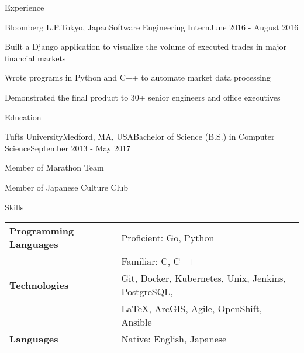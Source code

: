 \documentclass{resume}
\begin{document}
\begin{rSection}{Experience}
    \begin{rSubsection}{Bloomberg L.P.}{Tokyo, Japan}{Software Engineering Intern}{June 2016 - August 2016}{}{}
    \item Built a Django application to visualize the volume of executed trades in major financial markets
    \item Wrote programs in Python and C++ to automate market data processing
    \item Demonstrated the final product to 30+ senior engineers and office executives
    \end{rSubsection}
  
  \end{rSection}

  \begin{rSection}{Education}
    \begin{rSubsection}{Tufts University}{Medford, MA, USA}{Bachelor of Science (B.S.) in Computer Science}{September 2013 - May 2017}{}{}
      \item Member of Marathon Team
      \item Member of Japanese Culture Club
      \end{rSubsection}
  \end{rSection}
  
  \begin{rSection}{Skills}
    \begin{tabular}{ @{} >{\bfseries}l @{\hspace{6ex}} l }
      Programming Languages & Proficient: Go, Python \\
      & Familiar: C, C++ \\
      Technologies & Git, Docker, Kubernetes, Unix, Jenkins, PostgreSQL,\\
      & LaTeX, ArcGIS, Agile, OpenShift, Ansible \\
      Languages & Native: English, Japanese 
    \end{tabular}
  \end{rSection}
\end{document}
